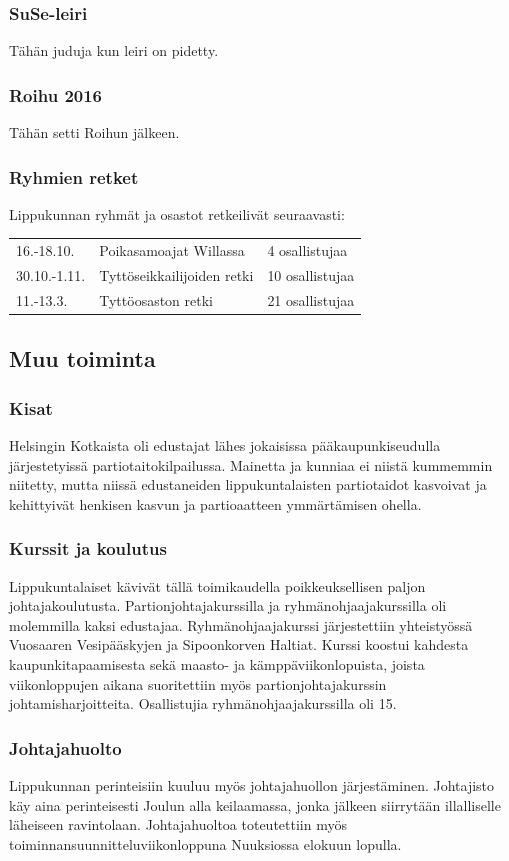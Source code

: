 \documentclass[a4paper, 12pt, finnish]{report} %
\begin{document}
\subsubsection{SuSe-leiri}
Tähän juduja kun leiri on pidetty.
\subsubsection{Roihu 2016}
Tähän setti Roihun jälkeen.
\subsubsection{Ryhmien retket}
Lippukunnan ryhmät ja osastot retkeilivät seuraavasti:
\begin{center}
	\begin{tabular}{l l l}
		16.-18.10. & Poikasamoajat Willassa & 4 osallistujaa\\
		30.10.-1.11. & Tyttöseikkailijoiden retki & 10 osallistujaa\\
		11.-13.3. & Tyttöosaston retki & 21 osallistujaa\\
	\end{tabular}
\end{center}
\subsection{Muu toiminta}
\subsubsection{Kisat}
Helsingin Kotkaista oli edustajat lähes jokaisissa pääkaupunkiseudulla järjestetyissä partiotaitokilpailussa. Mainetta ja kunniaa ei niistä kummemmin niitetty, mutta niissä edustaneiden lippukuntalaisten partiotaidot kasvoivat ja kehittyivät henkisen kasvun ja partioaatteen ymmärtämisen ohella.
\subsubsection{Kurssit ja koulutus}
Lippukuntalaiset kävivät tällä toimikaudella poikkeuksellisen paljon johtajakoulutusta. Partionjohtajakurssilla ja ryhmänohjaajakurssilla oli molemmilla kaksi edustajaa. Ryhmänohjaajakurssi järjestettiin yhteistyössä Vuosaaren Vesipääskyjen ja Sipoonkorven Haltiat. Kurssi koostui kahdesta kaupunkitapaamisesta sekä maasto- ja kämppäviikonlopuista, joista viikonloppujen aikana suoritettiin myös partionjohtajakurssin johtamisharjoitteita. Osallistujia ryhmänohjaajakurssilla oli 15.
\subsubsection{Johtajahuolto}
Lippukunnan perinteisiin kuuluu myös johtajahuollon järjestäminen. Johtajisto käy aina perinteisesti Joulun alla keilaamassa, jonka jälkeen siirrytään illalliselle läheiseen ravintolaan. Johtajahuoltoa toteutettiin myös toiminnansuunnitteluviikonloppuna Nuuksiossa elokuun lopulla.
\end{document}
